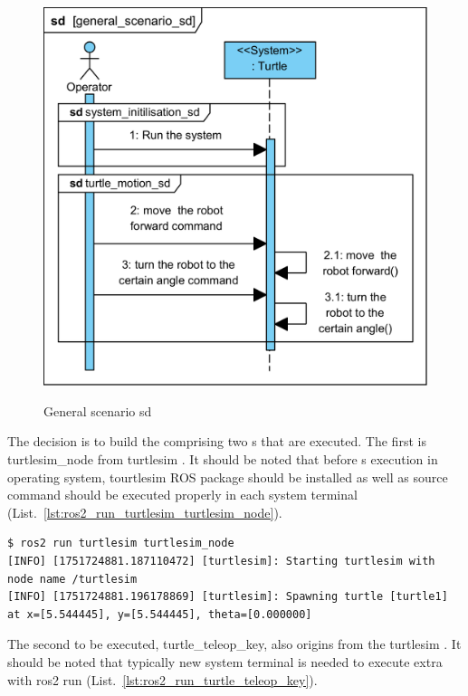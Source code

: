 \documentclass[11pt,oneside,a4paper]{report}
\begin{document}
\begin{figure}[H]
	\centering
	\begin{center}
		{\includegraphics[scale=1.0]{diagrams/general_scenario_sd.png}}
	\end{center}
	\caption{General scenario sd}
	\label{fig:general_scenario_sd}
\end{figure}


The decision is to build the \stSystem{} comprising two \stNode{}s that are executed. The first is \textsf{turtlesim\_node} \stNode{} from \textsf{turtlesim} \stPackage{}. It should be noted that before \stNode{}s execution in operating system, tourtlesim ROS package should be installed as well as source command should be executed properly in each system terminal (List.~\ref{lst:ros2_run_turtlesim_turtlesim_node}).

\begin{lstlisting}[style=terminal,label={lst:ros2_run_turtlesim_turtlesim_node},caption={ros2 run turtlesim turtlesim\_node}]
$ ros2 run turtlesim turtlesim_node
[INFO] [1751724881.187110472] [turtlesim]: Starting turtlesim with node name /turtlesim
[INFO] [1751724881.196178869] [turtlesim]: Spawning turtle [turtle1] at x=[5.544445], y=[5.544445], theta=[0.000000]
\end{lstlisting}

The second \stNode{} to be executed, \textsf{turtle\_teleop\_key}, also origins from the \textsf{turtlesim} \stPackage{}. It should be noted that typically new system terminal is needed to execute extra \stNode{} with \textsf{ros2 run} \stCLTool{} (List.~\ref{lst:ros2_run_turtle_teleop_key}).
\end{document}
